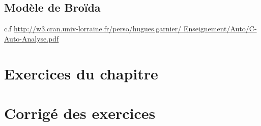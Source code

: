 \subsection{Modèle de Broïda}
\acplhp 
c.f \url{http://w3.cran.univ-lorraine.fr/perso/hugues.garnier/
Enseignement/Auto/C-Auto-Analyse.pdf}
\newpage
\section{Exercices du chapitre}
\small

\setcounter{numexos}{0}
\normalsize
\newpage
\restoregeometry
\captionsetup{width=0.9\linewidth}
\section{Corrigé des exercices}
\small

\normalsize
\restoregeometry
\captionsetup{width=0.9\linewidth}
